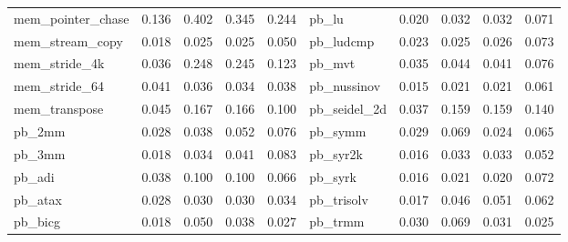 \begin{table}[t]
\begin{adjustbox}{max width=\textwidth}
\begin{tabular}{lrrrr|lrrrr}
mem\_pointer\_chase & 0.136 & 0.402 & 0.345 & 0.244 & pb\_lu & 0.020 & 0.032 & 0.032 & 0.071 \\
mem\_stream\_copy & 0.018 & 0.025 & 0.025 & 0.050 & pb\_ludcmp & 0.023 & 0.025 & 0.026 & 0.073 \\
mem\_stride\_4k & 0.036 & 0.248 & 0.245 & 0.123 & pb\_mvt & 0.035 & 0.044 & 0.041 & 0.076 \\
mem\_stride\_64 & 0.041 & 0.036 & 0.034 & 0.038 & pb\_nussinov & 0.015 & 0.021 & 0.021 & 0.061 \\
mem\_transpose & 0.045 & 0.167 & 0.166 & 0.100 & pb\_seidel\_2d & 0.037 & 0.159 & 0.159 & 0.140 \\
pb\_2mm & 0.028 & 0.038 & 0.052 & 0.076 & pb\_symm & 0.029 & 0.069 & 0.024 & 0.065 \\
pb\_3mm & 0.018 & 0.034 & 0.041 & 0.083 & pb\_syr2k & 0.016 & 0.033 & 0.033 & 0.052 \\
pb\_adi & 0.038 & 0.100 & 0.100 & 0.066 & pb\_syrk & 0.016 & 0.021 & 0.020 & 0.072 \\
pb\_atax & 0.028 & 0.030 & 0.030 & 0.034 & pb\_trisolv & 0.017 & 0.046 & 0.051 & 0.062 \\
pb\_bicg & 0.018 & 0.050 & 0.038 & 0.027 & pb\_trmm & 0.030 & 0.069 & 0.031 & 0.025 \\
\bottomrule
\end{tabular}%
\end{adjustbox}
\end{table}
